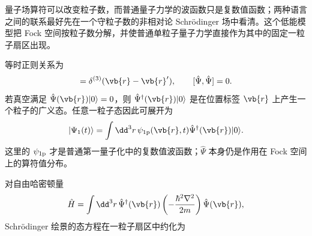 
量子场算符可以改变粒子数，而普通量子力学的波函数只是复数值函数；两种语言之间的联系最好先在一个守粒子数的非相对论 Schr\"odinger 场中看清。这个低能模型把 Fock 空间按粒子数分解，并使普通单粒子量子力学直接作为其中的固定一粒子扇区出现。

等时正则关系为
\begin{equation}
 [\hat\Psi(\vb{r}),\hat\Psi^\dagger(\vb{r}')]
 =\delta^{(3)}(\vb{r}-\vb{r}'),
 \qquad
 [\hat\Psi,\hat\Psi]=0.
 \label{eq:sch-field-comm-r6}
\end{equation}
若真空满足 $\hat\Psi(\vb{r})|0\rangle=0$，则 $\hat\Psi^\dagger(\vb{r})|0\rangle$ 是在位置标签 $\vb{r}$ 上产生一个粒子的广义态。任意一粒子态因此可展开为
\begin{equation}
 {
 |\Psi_1(t)\rangle
 =\int\dd^3 r\,
 \psi_{\rm 1p}(\vb{r},t)
 \hat\Psi^\dagger(\vb{r})|0\rangle .}
 \label{eq:fock-oneparticle-expansion-dp68}
\end{equation}
这里的 $\psi_{\rm 1p}$ 才是普通第一量子化中的复数值波函数；$\hat\Psi$ 本身仍是作用在 Fock 空间上的算符值分布。

对自由哈密顿量
\begin{equation*}
 \hat H
 =\int\dd^3 r\,
 \hat\Psi^\dagger(\vb{r})
 \left(-\frac{\hbar^2\nabla^2}{2m}\right)
 \hat\Psi(\vb{r}),
\end{equation*}
Schr\"odinger 绘景的态方程在一粒子扇区中约化为


